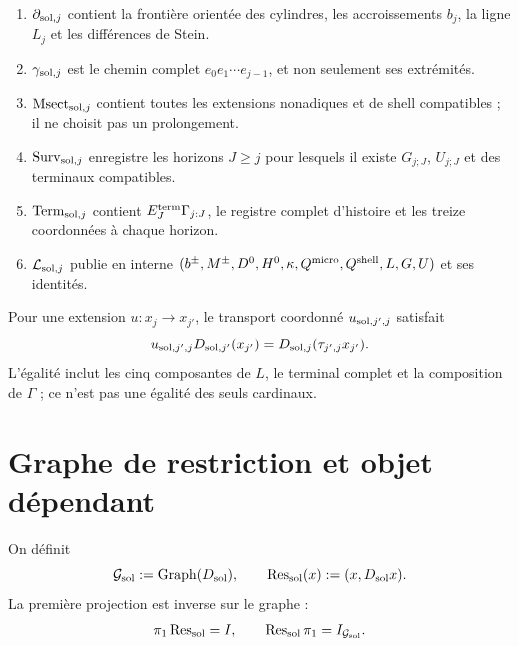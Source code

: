 \begin{enumerate}
       accroissements antérieurs.
 \item \(\partial_{{\rm sol},j}\) contient la frontière orientée des cylindres,
       les accroissements \(b_j\), la ligne \(L_j\) et les différences de Stein.
 \item \(\gamma_{{\rm sol},j}\) est le chemin complet
       \(e_0e_1\cdots e_{j-1}\), et non seulement ses extrémités.
 \item \(\operatorname{Msect}_{{\rm sol},j}\) contient toutes les extensions
       nonadiques et de shell compatibles ; il ne choisit pas un prolongement.
 \item \(\operatorname{Surv}_{{\rm sol},j}\) enregistre les horizons
       \(J\geq j\) pour lesquels il existe \(G_{j;J}\), \(U_{j;J}\) et
       des terminaux compatibles.
 \item \(\operatorname{Term}_{{\rm sol},j}\) contient
       \(E_J^{\rm term}\Gamma_{j:J}\), le registre complet d'histoire et
       les treize coordonnées à chaque horizon.
 \item \(\mathcal L_{{\rm sol},j}\) publie en interne
       \((b^\pm,M^\pm,D^0,H^0,\kappa,Q^{\rm micro},Q^{\rm shell},
       L,G,U)\) et ses identités.
\end{enumerate}

Pour une extension \(u:x_j\to x_{j'}\), le transport coordonné
\(u_{{\rm sol},j',j}\) satisfait
\begin{equation}\label{eq:pdfv2-sol-naturality-d}
 u_{{\rm sol},j',j}D_{{\rm sol},j'}(x_{j'})
 =D_{{\rm sol},j}(\tau_{j',j}x_{j'}).
\end{equation}
L'égalité inclut les cinq composantes de \(L\), le terminal complet et
la composition de \(\Gamma\) ; ce n'est pas une égalité des seuls cardinaux.

\section{Graphe de restriction et objet dépendant}
\label{sec:pdfv2-sol-graphs}

On définit
\begin{equation}\label{eq:pdfv2-sol-g-graph}
 \mathcal G_{\rm sol}:=\operatorname{Graph}(D_{\rm sol}),
 \qquad
 \operatorname{Res}_{\rm sol}(x):=(x,D_{\rm sol}x).
\end{equation}
La première projection est inverse sur le graphe :
\begin{equation}\label{eq:pdfv2-sol-res-inverse}
 \pi_1\operatorname{Res}_{\rm sol}=I,
 \qquad
 \operatorname{Res}_{\rm sol}\pi_1=I_{\mathcal G_{\rm sol}}.
\end{equation}

